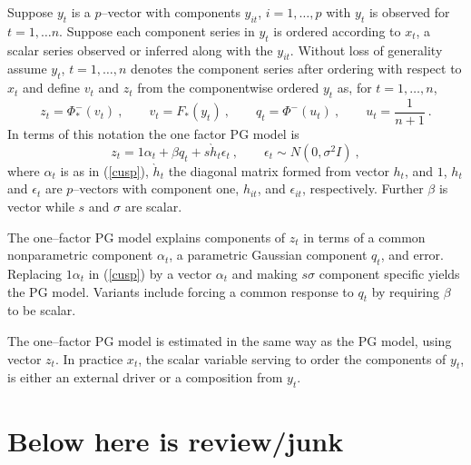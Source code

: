 \documentclass[authoryear]{elsarticle}
\newcommand{\eps}{\epsilon}
\newcommand{\eref}[1]{(\ref{#1})}
\newcommand{\cq}{\ , \qquad}
\newcommand{\be}[1]{\begin{equation}\label{#1}}
\newcommand{\ee}{\end{equation}}
\begin{document}
Suppose $y_t$ is a $p$--vector with components $y_{it}$, $i=1,\ldots,p$ with $y_t$ is observed for $t=1,\ldots n$.   Suppose each component series in $y_t$ is ordered according to $x_t$, a scalar series observed or inferred along with the $y_{it}$.   Without loss of generality assume $y_t$, $t=1,\ldots,n$ denotes the component series after ordering with respect to $x_t$ and define $v_t$ and $z_t$ from the componentwise ordered $y_t$ as, for $t=1,\ldots,n$, 
$$
z_t = \Phi^-_*(v_t)\cq v_t = F_*(y_t)\cq q_t=\Phi^-(u_t)\cq u_t=\frac{1}{n+1}\ .
$$
In terms of this notation the one factor PG model is
\be{factor}
z_t = 1\alpha_t + \beta q_t + s\grave h_t\eps_t\cq \eps_{t} \sim N(0,\sigma^2I)\ ,
\ee
where $\alpha_t$ is  as in \eref{cusp}, $\grave h_t$ the diagonal matrix formed from vector $h_t$, and $1$,  $h_t$ and $\eps_t$ are $p$--vectors with component one,  $h_{it}$,  and $\eps_{it}$, respectively.  Further $\beta$ is vector while $s$ and $\sigma$ are scalar.

The one--factor PG model explains components of $z_t$ in terms of a common nonparametric component $\alpha_t$, a parametric Gaussian component $q_t$, and error.  Replacing $1\alpha_t$ in \eref{cusp} by a vector  $\alpha_t$ and making $s\sigma$ component specific  yields the PG model.  Variants include forcing  a common response to $q_t$ by requiring  $\beta$ to be scalar. 

The one--factor PG model is estimated in the same way as the PG model, using vector $z_t$.   In practice $x_t$, the scalar variable serving to order the components of $y_t$, is either an external driver or a composition from $y_t$.
 

\section{Below here is review/junk}
\end{document}
